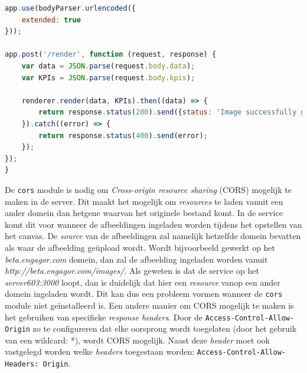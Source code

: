 \begin{lstlisting}[caption={index.js - Node.js server},label=lst:ExpressIndexServer,language=javascript]
app.use(bodyParser.urlencoded({
	extended: true
}));

app.post('/render', function (request, response) {
	var data = JSON.parse(request.body.data);
	var KPIs = JSON.parse(request.body.kpis);
	
	renderer.render(data, KPIs).then((data) => {
		return response.status(200).send({status: 'Image successfully generated', image: 	data.toString('base64')});
	}).catch((error) => {
		return response.status(400).send(error);
	});
});
}
\end{lstlisting}

De \texttt{cors} module is nodig om \textit{Cross-origin resource sharing} (CORS) mogelijk te maken in de server. Dit maakt het mogelijk om \textit{resources} te laden vanuit een ander domein dan hetgene waarvan het originele bestand komt. In de service komt dit voor wanneer de afbeeldingen ingeladen worden tijdens het opstellen van het canvas. De \textit{source} van de afbeeldingen zal namelijk hetzelfde domein bevatten als waar de afbeelding ge\"{u}pload wordt. Wordt bijvoorbeeld gewerkt op het \textit{beta.engagor.com} domein, dan zal de afbeelding ingeladen worden vanuit \textit{http://beta.engagor.com/images/}. Als geweten is dat de service op het \textit{server603:3000} loopt, dan is duidelijk dat hier een \textit{resource} vanop een ander domein ingeladen wordt. Dit kan dus een probleem vormen wanneer de \texttt{cors} module niet ge\"{i}nstalleerd is. %
Een andere manier om CORS mogelijk te maken is het gebruiken van specifieke \textit{response headers}. Door de \texttt{Access-Control-Allow-Origin} zo te configureren dat elke oorsprong wordt toegelaten (door het gebruik van een wildcard: *), wordt CORS mogelijk. Naast deze \textit{header} moet ook vastgelegd worden welke \textit{headers} toegestaan worden: \texttt{Access-Control-Allow-Headers: Origin}. %





